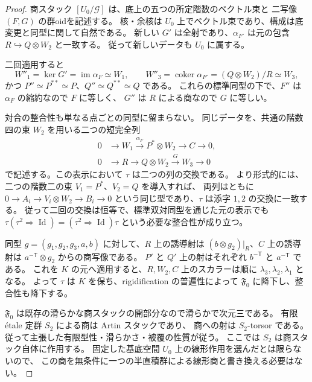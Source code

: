 \begin{proof}
商スタック $[U_0/\mathcal G]$ は、底上の五つの所定階数のベクトル束と
二写像 $(F,G)$ の群oidを記述する。
核・余核は $U_0$ 上でベクトル束であり、構成は底変更と同型に関して自然である。
新しい $G'$ は全射であり、$\alpha_{F'}$ は元の包含
$R\hookrightarrow Q\otimes W_2$ と一致する。
従って新しいデータも $U_0$ に属する。

二回適用すると
\[
 W''_1=\ker G'=\operatorname{im}\alpha_F\simeq W_1,
 \qquad
 W''_3=\operatorname{coker}\alpha_{F'}
      =(Q\otimes W_2)/R\simeq W_3,
\]
かつ $P''\simeq P^{**}\simeq P$、$Q''\simeq Q^{**}\simeq Q$ である。
これらの標準同型の下で、$F''$ は $\alpha_F$ の縮約なので $F$ に等しく、
$G''$ は $R$ による商なので $G$ に等しい。

対合の整合性も単なる点ごとの同型に留まらない。
同じデータを、共通の階数四の束 $W_2$ を用いる二つの短完全列
\[
 \begin{split}
 0&\longrightarrow W_1\xrightarrow{\alpha_F}
       P^*\otimes W_2\longrightarrow C\longrightarrow0,\\
 0&\longrightarrow R\longrightarrow
       Q\otimes W_2\xrightarrow G W_3\longrightarrow0
 \end{split}
\]
で記述する。この表示において $\tau$ は二つの列の交換である。
より形式的には、二つの階数二の束 $V_1=P^*$、$V_2=Q$ を導入すれば、
両列はともに $0\to A_i\to V_i\otimes W_2\to B_i\to0$
という同じ型であり、$\tau$ は添字 $1,2$ の交換に一致する。
従って二回の交換は恒等で、標準双対同型を通じた元の表示でも
$\tau(\tau^2\Rightarrow\operatorname{Id})
 = (\tau^2\Rightarrow\operatorname{Id})\tau$
という必要な整合性が成り立つ。

同型 $g=(g_1,g_2,g_3,a,b)$ に対して、$R$ 上の誘導射は
$(b\otimes g_2)|_R$、$C$ 上の誘導射は
$a^{-\mathsf T}\otimes g_2$ からの商写像である。
$P'$ と $Q'$ 上の射はそれぞれ $b^{-\mathsf T}$ と $a^{-\mathsf T}$ である。
これを $K$ の元へ適用すると、$R,W_2,C$ 上のスカラーは順に
$\lambda_3,\lambda_2,\lambda_1$ となる。
よって $\tau$ は $K$ を保ち、rigidification の普遍性によって
$\mathfrak F_0$ に降下し、整合性も降下する。

$\mathfrak F_0$ は既存の滑らかな商スタックの開部分なので滑らかで次元三である。
有限 étale 定群 $S_2$ による商は Artin スタックであり、
商への射は $S_2$-torsor である。
従って主張した有限型性・滑らかさ・被覆の性質が従う。
ここでは $S_2$ は商スタック自体に作用する。
固定した基底空間 $U_0$ 上の線形作用を選んだとは限らないので、
この商を無条件に一つの半直積群による線形商と書き換える必要はない。
\end{proof}

